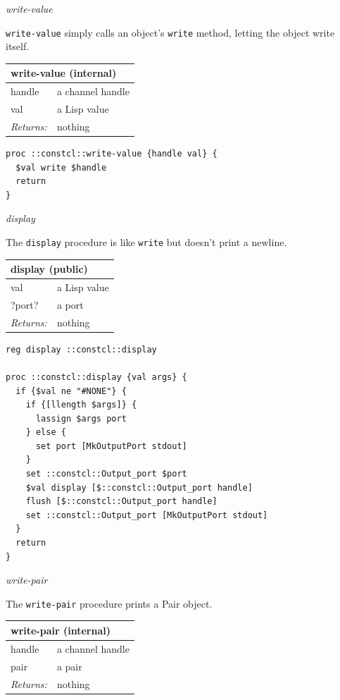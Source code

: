 \documentclass[twoside,9pt]{report}
\begin{document}
\emph{write-value}


\texttt{write-value} simply calls an object's \texttt{write} method, letting the object write itself.

\begin{tabular}{ |l l| }
\hline
\multicolumn{2}{|l|}{write-value (internal)} \\
\hline
handle & a channel handle \\
val & a Lisp value \\
\textit{Returns:} & nothing \\
\hline
\end{tabular}

\noindent\makebox[\linewidth]{\rule{\linewidth}{0.4pt}}
\begin{lstlisting}
proc ::constcl::write-value {handle val} {
  $val write $handle
  return
}
\end{lstlisting}
\noindent\makebox[\linewidth]{\rule{\linewidth}{0.4pt}}

\emph{display}


The \texttt{display} procedure is like \texttt{write} but doesn't print a newline.

\begin{tabular}{ |l l| }
\hline
\multicolumn{2}{|l|}{display (public)} \\
\hline
val & a Lisp value \\
?port? & a port \\
\textit{Returns:} & nothing \\
\hline
\end{tabular}

\noindent\makebox[\linewidth]{\rule{\linewidth}{0.4pt}}
\begin{lstlisting}
reg display ::constcl::display
 
proc ::constcl::display {val args} {
  if {$val ne "#NONE"} {
    if {[llength $args]} {
      lassign $args port
    } else {
      set port [MkOutputPort stdout]
    }
    set ::constcl::Output_port $port
    $val display [$::constcl::Output_port handle]
    flush [$::constcl::Output_port handle]
    set ::constcl::Output_port [MkOutputPort stdout]
  }
  return
}
\end{lstlisting}
\noindent\makebox[\linewidth]{\rule{\linewidth}{0.4pt}}

\emph{write-pair}


The \texttt{write-pair} procedure prints a Pair object.

\begin{tabular}{ |l l| }
\hline
\multicolumn{2}{|l|}{write-pair (internal)} \\
\hline
handle & a channel handle \\
pair & a pair \\
\textit{Returns:} & nothing \\
\hline
\end{tabular}
\end{document}
